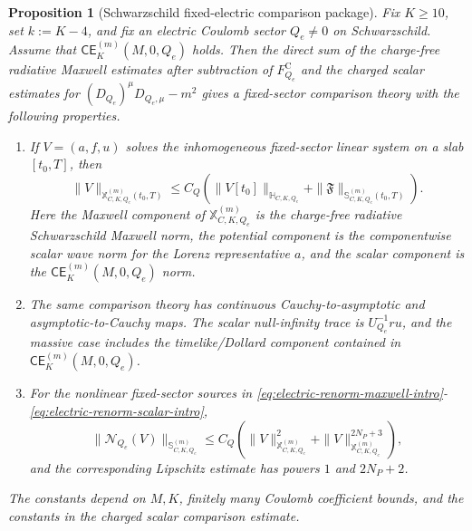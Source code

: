 \documentclass[11pt]{article}
\numberwithin{equation}{section}
\theoremstyle{plain}
\newtheorem{proposition}[theorem]{Proposition}
\theoremstyle{definition}
\theoremstyle{remark}
\newcommand{\CElec}{\mathsf{CE}}
\begin{document}
\begin{proposition}[Schwarzschild fixed-electric comparison package]\label{prop:schwarzschild-fixed-electric-package}
Fix $K\ge10$, set $k:=K-4$, and fix an electric Coulomb sector $Q_e\ne0$ on Schwarzschild.  Assume that $\CElec^{(m)}_K(M,0,Q_e)$ holds.  Then the direct sum of the charge-free radiative Maxwell estimates after subtraction of $F^{\mathrm C}_{Q_e}$ and the charged scalar estimates for $(D_{Q_e})^\mu D_{Q_e,\mu}-m^2$ gives a fixed-sector comparison theory with the following properties.
\begin{enumerate}
\item[(i)] If $V=(a,f,u)$ solves the inhomogeneous fixed-sector linear system on a slab $[t_0,T]$, then
\begin{equation}\label{eq:schw-fixed-electric-linear-bound}
 \|V\|_{\mathbb X^{(m)}_{C,K,Q_e}(t_0,T)}
 \le C_Q\left(\|V[t_0]\|_{\mathbb H_{C,K,Q_e}}+
 \|\mathfrak F\|_{\mathbb S^{(m)}_{C,K,Q_e}(t_0,T)}\right).
\end{equation}
Here the Maxwell component of $\mathbb X^{(m)}_{C,K,Q_e}$ is the charge-free radiative Schwarzschild Maxwell norm, the potential component is the componentwise scalar wave norm for the Lorenz representative $a$, and the scalar component is the $\CElec^{(m)}_K(M,0,Q_e)$ norm.
\item[(ii)] The same comparison theory has continuous Cauchy-to-asymptotic and asymptotic-to-Cauchy maps.  The scalar null-infinity trace is $U_{Q_e}^{-1}ru$, and the massive case includes the timelike/Dollard component contained in $\CElec^{(m)}_K(M,0,Q_e)$.
\item[(iii)] For the nonlinear fixed-sector sources in \eqref{eq:electric-renorm-maxwell-intro}-\eqref{eq:electric-renorm-scalar-intro},
\begin{equation}\label{eq:schw-fixed-electric-source-bound}
 \|\mathcal N_{Q_e}(V)\|_{\mathbb S^{(m)}_{C,K,Q_e}}
 \le C_Q\left(\|V\|_{\mathbb X^{(m)}_{C,K,Q_e}}^2+
 \|V\|_{\mathbb X^{(m)}_{C,K,Q_e}}^{2N_P+3}\right),
\end{equation}
and the corresponding Lipschitz estimate has powers $1$ and $2N_P+2$.
\end{enumerate}
The constants depend on $M,K$, finitely many Coulomb coefficient bounds, and the constants in the charged scalar comparison estimate.
\end{proposition}
\end{document}
